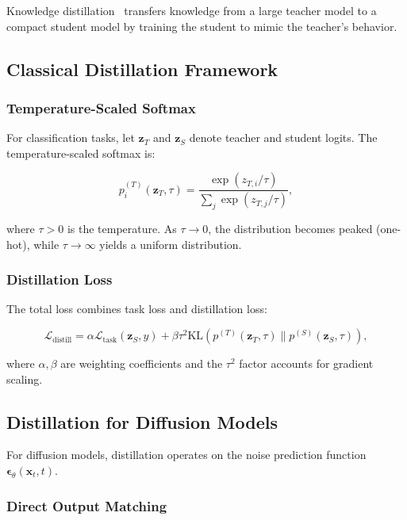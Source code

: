 \documentclass[12pt]{report}
\theoremstyle{definition}
\newcommand{\KL}{\text{KL}}
\newcommand{\loss}{\mathcal{L}}
\begin{document}
Knowledge distillation~\citep{hinton2015distilling} transfers knowledge from a large teacher model to a compact student model by training the student to mimic the teacher's behavior.

\subsection{Classical Distillation Framework}

\subsubsection{Temperature-Scaled Softmax}

For classification tasks, let $\mathbf{z}_T$ and $\mathbf{z}_S$ denote teacher and student logits. The temperature-scaled softmax is:

\begin{equation}
p_i^{(T)}(\mathbf{z}_T, \tau) = \frac{\exp(z_{T,i}/\tau)}{\sum_j \exp(z_{T,j}/\tau)},
\label{eq:temp_softmax}
\end{equation}

where $\tau > 0$ is the temperature. As $\tau \to 0$, the distribution becomes peaked (one-hot), while $\tau \to \infty$ yields a uniform distribution.

\subsubsection{Distillation Loss}

The total loss combines task loss and distillation loss:

\begin{equation}
\loss_{\text{distill}} = \alpha \loss_{\text{task}}(\mathbf{z}_S, y) + \beta \tau^2 \KL(p^{(T)}(\mathbf{z}_T, \tau) \| p^{(S)}(\mathbf{z}_S, \tau)),
\label{eq:distill_loss_classification}
\end{equation}

where $\alpha, \beta$ are weighting coefficients and the $\tau^2$ factor accounts for gradient scaling.

\subsection{Distillation for Diffusion Models}

For diffusion models, distillation operates on the noise prediction function $\boldsymbol{\epsilon}_\theta(\mathbf{x}_t, t)$.

\subsubsection{Direct Output Matching}
\end{document}
